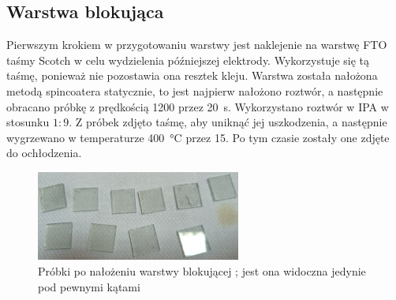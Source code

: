\documentclass[a4, 12pt]{article}
\begin{document}
	\subsection{Warstwa blokująca }
	Pierwszym krokiem w przygotowaniu warstwy jest naklejenie na warstwę FTO taśmy Scotch w celu wydzielenia późniejszej elektrody. Wykorzystuje się tą taśmę, ponieważ nie pozostawia ona resztek kleju. Warstwa  została nałożona metodą spincoatera statycznie, to jest najpierw nałożono roztwór, a następnie obracano próbkę z prędkością \qty{1200}{\rpm} przez \qty{20}{\s}. Wykorzystano roztwór  w IPA w stosunku $1:9$. Z próbek zdjęto taśmę, aby uniknąć jej uszkodzenia, a następnie wygrzewano w temperaturze \qty{400}{\degreeCelsius} przez \qty{15}{\min}. Po tym czasie zostały one zdjęte do ochłodzenia. 
	\begin{figure}[H]
		\centering
		\includegraphics[width=0.6\textwidth]{probki_tio2_blok.png}
		\caption{Próbki po nałożeniu warstwy blokującej ; jest ona widoczna jedynie pod pewnymi kątami}
	\end{figure}
	
\end{document}
